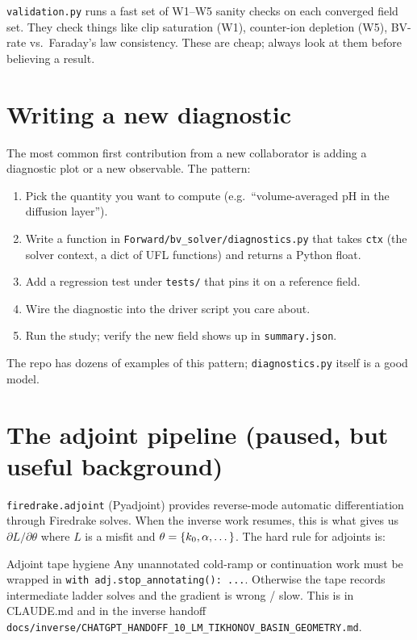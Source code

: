 \documentclass[11pt]{article}
\begin{document}
\texttt{validation.py} runs a fast set of W1--W5 sanity checks on
each converged field set. They check things like clip saturation
(W1), counter-ion depletion (W5), BV-rate vs.\ Faraday's law
consistency. These are cheap; always look at them before believing
a result.

\section{Writing a new diagnostic}

The most common first contribution from a new collaborator is
adding a diagnostic plot or a new observable. The pattern:

\begin{enumerate}[leftmargin=*]
\item Pick the quantity you want to compute (e.g.\ ``volume-averaged
      pH in the diffusion layer'').
\item Write a function in
      \texttt{Forward/bv\_solver/diagnostics.py} that takes
      \texttt{ctx} (the solver context, a dict of UFL functions)
      and returns a Python float.
\item Add a regression test under \texttt{tests/} that pins it on a
      reference field.
\item Wire the diagnostic into the driver script you care about.
\item Run the study; verify the new field shows up in
      \texttt{summary.json}.
\end{enumerate}

The repo has dozens of examples of this pattern;
\texttt{diagnostics.py} itself is a good model.

\section{The adjoint pipeline (paused, but useful background)}

\texttt{firedrake.adjoint} (Pyadjoint) provides reverse-mode
automatic differentiation through Firedrake solves. When the inverse
work resumes, this is what gives us $\partial L/\partial \theta$
where $L$ is a misfit and $\theta = \{k_0, \alpha, \dots\}$. The
hard rule for adjoints is:
\begin{callout}{Adjoint tape hygiene}
Any unannotated cold-ramp or continuation work must be wrapped in
\texttt{with adj.stop\_annotating(): ...}. Otherwise the tape
records intermediate ladder solves and the gradient is wrong /
slow. This is in CLAUDE.md and in the inverse handoff
\texttt{docs/inverse/CHATGPT\_HANDOFF\_10\_LM\_TIKHONOV\_BASIN\_GEOMETRY.md}.
\end{callout}
\end{document}
